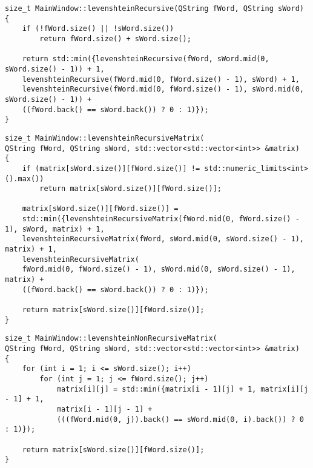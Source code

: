 \documentclass[12pt]{report}
\begin{document}
\begin{lstlisting}[label=some-code,caption=Функция реализации рекурсивного алгоритма Левенштейна]
size_t MainWindow::levenshteinRecursive(QString fWord, QString sWord)
{
    if (!fWord.size() || !sWord.size())
        return fWord.size() + sWord.size();

    return std::min({levenshteinRecursive(fWord, sWord.mid(0, sWord.size() - 1)) + 1,
    levenshteinRecursive(fWord.mid(0, fWord.size() - 1), sWord) + 1,
    levenshteinRecursive(fWord.mid(0, fWord.size() - 1), sWord.mid(0, sWord.size() - 1)) +
    ((fWord.back() == sWord.back()) ? 0 : 1)});
}
\end{lstlisting}

\begin{lstlisting}[label=some-code,caption=Функция реализации рекурсивного алгоритма Левенштейна с использованием матрицы расстояний]
size_t MainWindow::levenshteinRecursiveMatrix(
QString fWord, QString sWord, std::vector<std::vector<int>> &matrix)
{
    if (matrix[sWord.size()][fWord.size()] != std::numeric_limits<int>().max())
        return matrix[sWord.size()][fWord.size()];

    matrix[sWord.size()][fWord.size()] =
    std::min({levenshteinRecursiveMatrix(fWord.mid(0, fWord.size() - 1), sWord, matrix) + 1,
    levenshteinRecursiveMatrix(fWord, sWord.mid(0, sWord.size() - 1), matrix) + 1,
    levenshteinRecursiveMatrix(
    fWord.mid(0, fWord.size() - 1), sWord.mid(0, sWord.size() - 1), matrix) +
    ((fWord.back() == sWord.back()) ? 0 : 1)});

    return matrix[sWord.size()][fWord.size()];
}
\end{lstlisting}

\begin{lstlisting}[label=some-code,caption=Функция реализации итеративного алгоритма Левенштейна]
size_t MainWindow::levenshteinNonRecursiveMatrix(
QString fWord, QString sWord, std::vector<std::vector<int>> &matrix)
{
    for (int i = 1; i <= sWord.size(); i++)
        for (int j = 1; j <= fWord.size(); j++)
            matrix[i][j] = std::min({matrix[i - 1][j] + 1, matrix[i][j - 1] + 1,
            matrix[i - 1][j - 1] +
            (((fWord.mid(0, j)).back() == sWord.mid(0, i).back()) ? 0 : 1)});

    return matrix[sWord.size()][fWord.size()];
}
\end{lstlisting}
\end{document}
